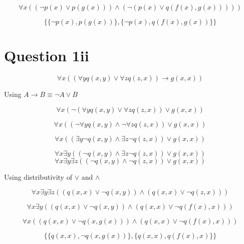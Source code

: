 \documentclass[10pt,a4paper]{article}
\begin{document}
\begin{equation}
 \forall x ((\neg p(x) \vee p(g(x)))\wedge(\neg (p(x) \vee q(f(x),g(x)))))
\end{equation}

\begin{equation}
 \{\{\neg p(x),p(g(x))\},\{\neg p(x),q(f(x),g(x))\}\}
\end{equation}



\section{Question 1ii}

\begin{equation}
 \forall x ((\forall y q(x,y) \vee \forall z q(z,x))\rightarrow g(x,x))
\end{equation}

Using $A\rightarrow B \equiv \neg A \vee B$

\begin{equation}
 \forall x (\neg(\forall y q(x,y) \vee \forall z q(z,x))\vee g(x,x))
\end{equation}


\begin{equation}
 \forall x ((\neg\forall y q(x,y) \wedge \neg \forall z q(z,x))\vee g(x,x))
\end{equation}

\begin{equation}
 \forall x (( \exists y \neg q(x,y) \wedge  \exists z \neg q(z,x))\vee g(x,x))
\end{equation}

\begin{equation}
 \forall x \exists y((  \neg q(x,y) \wedge  \exists z \neg q(z,x))\vee g(x,x))
\end{equation}
\begin{equation}
 \forall x \exists y\exists z((  \neg q(x,y) \wedge   \neg q(z,x))\vee g(x,x))
\end{equation}


Using distributivity of $\vee$ and $\wedge$


\begin{equation}
 \forall x \exists y\exists z(( q(x,x) \vee \neg q(x,y))\wedge (q(x,x) \vee \neg q(z,x)))
\end{equation}


\begin{equation}
 \forall x \exists y(( q(x,x) \vee \neg q(x,y))\wedge (q(x,x) \vee \neg q(f(x),x)))
\end{equation}

\begin{equation}
 \forall x (( q(x,x) \vee \neg q(x,g(x)))\wedge (q(x,x) \vee \neg q(f(x),x)))
\end{equation}


\begin{equation}
 \{\{q(x,x),\neg q(x,g(x))\},\{q(x,x),q(f(x),x)\}\}
\end{equation}
\end{document}
